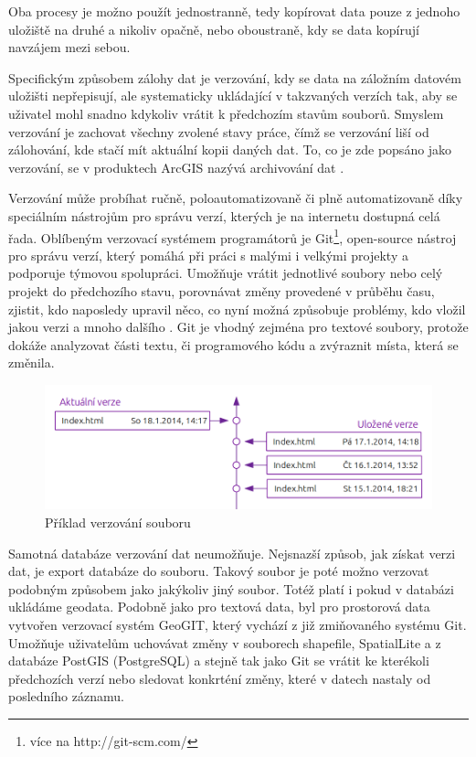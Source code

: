 Oba procesy je možno použít jednostranně, tedy kopírovat data pouze z jednoho uložiště na druhé a nikoliv opačně, nebo oboustraně, kdy se data kopírují navzájem mezi sebou.

Specifickým způsobem zálohy dat je verzování, kdy se data na záložním datovém uložišti nepřepisují, ale systematicky ukládající v takzvaných verzích tak, aby se uživatel mohl snadno kdykoliv vrátit k předchozím stavům souborů. Smyslem verzování je zachovat všechny zvolené stavy práce, čímž se verzování liší od zálohování, kde stačí mít aktuální kopii daných dat. To, co je zde popsáno jako verzování, se v produktech ArcGIS nazývá archivování dat \citep{Law2008}. 

Verzování může probíhat ručně, poloautomatizovaně či plně automatizovaně díky speciálním nástrojům pro správu verzí, kterých je na internetu dostupná celá řada. Oblíbeným verzovací systémem programátorů je Git\footnote{více na http://git-scm.com/}, open-source nástroj pro správu verzí, který pomáhá při práci s malými i velkými projekty a podporuje týmovou spolupráci. Umožňuje vrátit jednotlivé soubory nebo celý projekt do předchozího stavu, porovnávat změny provedené v průběhu času, zjistit, kdo naposledy upravil něco, co nyní možná způsobuje problémy, kdo vložil jakou verzi a mnoho dalšího \citep{Chacon2009}. Git je vhodný zejména pro textové soubory, protože dokáže analyzovat části textu, či programového kódu a zvýraznit místa, která se změnila.
        
          \begin{figure}[H]
            \centering
            \includegraphics[scale=1]{../../../grafy/obr/schema_verzovani_maxiTence.png}
            \caption {Příklad verzování souboru}
          \end{figure}
Samotná databáze verzování dat neumožňuje. Nejsnazší způsob, jak získat verzi dat, je export databáze do souboru. Takový soubor je poté možno verzovat podobným způsobem jako jakýkoliv jiný soubor. Totéž platí i pokud v databázi ukládáme geodata. Podobně jako pro textová data, byl pro prostorová data vytvořen verzovací systém GeoGIT, který vychází z již zmiňovaného systému Git. Umožňuje uživatelům uchovávat změny v souborech shapefile, SpatialLite a z databáze PostGIS (PostgreSQL) a stejně tak jako Git se vrátit ke kterékoli předchozích verzí nebo sledovat konkrténí změny, které v datech nastaly od posledního záznamu. 

